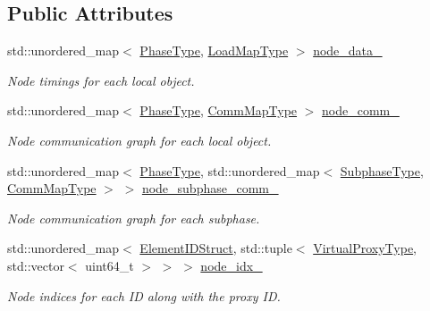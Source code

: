 \subsection*{Public Attributes}
\begin{DoxyCompactItemize}
\item 
std\+::unordered\+\_\+map$<$ \hyperlink{namespacevt_a46ce6733d5cdbd735d561b7b4029f6d7}{Phase\+Type}, \hyperlink{namespacevt_1_1vrt_1_1collection_1_1balance_a5339303db2e1ce964d783a53fd74e6b1}{Load\+Map\+Type} $>$ \hyperlink{structvt_1_1vrt_1_1collection_1_1balance_1_1_stats_data_a34a782537ef1b33bfc1c7b1f635e1c72}{node\+\_\+data\+\_\+}
\begin{DoxyCompactList}\small\item\em Node timings for each local object. \end{DoxyCompactList}\item 
std\+::unordered\+\_\+map$<$ \hyperlink{namespacevt_a46ce6733d5cdbd735d561b7b4029f6d7}{Phase\+Type}, \hyperlink{namespacevt_1_1vrt_1_1collection_1_1balance_a10860c956804d644db54a16012352728}{Comm\+Map\+Type} $>$ \hyperlink{structvt_1_1vrt_1_1collection_1_1balance_1_1_stats_data_a5ee2aea35e48a4855c8f99c16b588287}{node\+\_\+comm\+\_\+}
\begin{DoxyCompactList}\small\item\em Node communication graph for each local object. \end{DoxyCompactList}\item 
std\+::unordered\+\_\+map$<$ \hyperlink{namespacevt_a46ce6733d5cdbd735d561b7b4029f6d7}{Phase\+Type}, std\+::unordered\+\_\+map$<$ \hyperlink{namespacevt_ae78cbfdf1e57470e33eedb074f2beeba}{Subphase\+Type}, \hyperlink{namespacevt_1_1vrt_1_1collection_1_1balance_a10860c956804d644db54a16012352728}{Comm\+Map\+Type} $>$ $>$ \hyperlink{structvt_1_1vrt_1_1collection_1_1balance_1_1_stats_data_ac78802ff554a4d802a163afa5756412e}{node\+\_\+subphase\+\_\+comm\+\_\+}
\begin{DoxyCompactList}\small\item\em Node communication graph for each subphase. \end{DoxyCompactList}\item 
std\+::unordered\+\_\+map$<$ \hyperlink{structvt_1_1vrt_1_1collection_1_1balance_1_1_element_i_d_struct}{Element\+I\+D\+Struct}, std\+::tuple$<$ \hyperlink{namespacevt_a1b417dd5d684f045bb58a0ede70045ac}{Virtual\+Proxy\+Type}, std\+::vector$<$ uint64\+\_\+t $>$ $>$ $>$ \hyperlink{structvt_1_1vrt_1_1collection_1_1balance_1_1_stats_data_a28e705281f97d1afd659848de7af7d7b}{node\+\_\+idx\+\_\+}
\begin{DoxyCompactList}\small\item\em Node indices for each ID along with the proxy ID. \end{DoxyCompactList}\end{DoxyCompactItemize}


